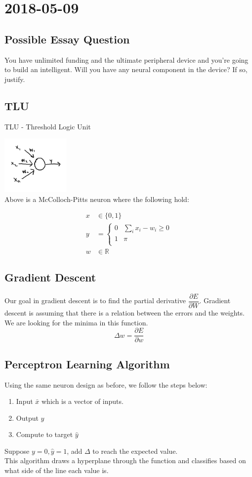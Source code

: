 \documentclass{report}
\theoremstyle{plain}
\theoremstyle{definition}
\theoremstyle{plain}
\newcommand{\mychapter}[2]{
	\setcounter{chapter}{#1}
	\setcounter{section}{0}
	\chapter*{#2}
	\addcontentsline{toc}{chapter}{#2}
}
\begin{document}
\mychapter{1}{2018-05-09}
\section{Possible Essay Question}
You have unlimited funding and the ultimate peripheral device and you're going to build an intelligent. Will you have any neural component in the device? If so, justify.

\section{TLU}
TLU - Threshold Logic Unit\\
\begin{center}
\centering
\includegraphics[width=0.25\textwidth]{McColloch-Pitts-Neuron}\\
Above is a McColloch-Pitts neuron where the following hold:
\end{center}
\begin{align}
x &\in \{0,1\}\\
y&=\left\{\begin{array}{cc}0 & \sum_i x_i-w_i \geq 0\\1 & \pi\\\end{array} \right.\\
w &\in \mathbb{R}
\end{align}

\section{Gradient Descent}
Our goal in gradient descent is to find the partial derivative $\dfrac{\partial E}{\partial W}$. Gradient descent is assuming that there is a relation between the errors and the weights. We are looking for the minima in this function.
\[ \Delta w = \dfrac{\partial E}{\partial w} \]

\section{Perceptron Learning Algorithm}
Using the same neuron design as before, we follow the steps below:
\begin{enumerate}
\item Input $\bar{x}$ which is a vector of inputs.
\item Output $y$
\item Compute to target $\hat{y}$
\end{enumerate}

Suppose $y=0,\hat{y}=1$, add $\Delta$ to reach the expected value.\\
This algorithm draws a hyperplane through the function and classifies based on what side of the line each value is. 
\end{document}
